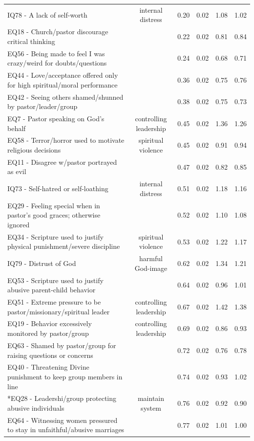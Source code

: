 \documentclass[
  letterpaper,
]{article}
\begin{document}
\begin{longtable}[t]{>{\raggedright\arraybackslash}p{11cm}ccccc}
*IQ78 - A lack of self-worth & internal distress & 0.20 & 0.02 & 1.08 & 1.02\\
EQ18 - Church/pastor discourage critical thinking &  & 0.22 & 0.02 & 0.81 & 0.84\\
\addlinespace
EQ56 - Being made to feel I was crazy/weird for doubts/questions &  & 0.24 & 0.02 & 0.68 & 0.71\\
EQ44 - Love/acceptance offered only for high spiritual/moral performance &  & 0.36 & 0.02 & 0.75 & 0.76\\
EQ42 - Seeing others shamed/shunned by pastor/leader/group &  & 0.38 & 0.02 & 0.75 & 0.73\\
*EQ7 - Pastor speaking on God's behalf & controlling leadership & 0.45 & 0.02 & 1.36 & 1.26\\
*EQ58 - Terror/horror used to motivate religious decisions & spiritual violence & 0.45 & 0.02 & 0.91 & 0.94\\
\addlinespace
EQ11 - Disagree w/pastor portrayed as evil &  & 0.47 & 0.02 & 0.82 & 0.85\\
*IQ73 - Self-hatred or self-loathing & internal distress & 0.51 & 0.02 & 1.18 & 1.16\\
EQ29 - Feeling special when in pastor’s good graces; otherwise ignored &  & 0.52 & 0.02 & 1.10 & 1.08\\
*EQ34 - Scripture used to justify physical punishment/severe discipline & spiritual violence & 0.53 & 0.02 & 1.22 & 1.17\\
*IQ79 - Distrust of God & harmful God-image & 0.62 & 0.02 & 1.34 & 1.21\\
\addlinespace
EQ53 - Scripture used to justify abusive parent-child behavior &  & 0.64 & 0.02 & 0.96 & 1.01\\
*EQ51 - Extreme pressure to be pastor/missionary/spiritual leader & controlling leadership & 0.67 & 0.02 & 1.42 & 1.38\\
*EQ19 - Behavior excessively monitored by pastor/group & controlling leadership & 0.69 & 0.02 & 0.86 & 0.93\\
EQ63 - Shamed by pastor/group for raising questions or concerns &  & 0.72 & 0.02 & 0.76 & 0.78\\
EQ40 - Threatening Divine punishment to keep group members in line &  & 0.74 & 0.02 & 0.93 & 1.02\\
\addlinespace
*EQ28 - Leadershi/group protecting abusive individuals & maintain system & 0.76 & 0.02 & 0.92 & 0.90\\
EQ64 - Witnessing women pressured to stay in unfaithful/abusive marriages &  & 0.77 & 0.02 & 1.01 & 1.00\\

\end{longtable}
\end{document}

